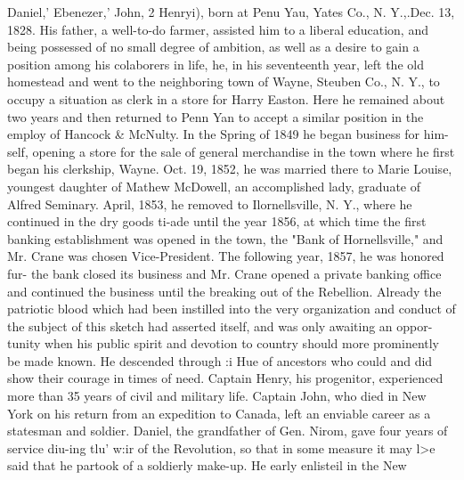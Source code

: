 \documentclass[oneside]{book}
\begin{document}
Daniel,' Ebenezer,' John, 2 Henryi), born at Penu Yau, Yates 
Co., N. Y.,.Dec. 13, 1828. His father, a well-to-do farmer, 
assisted him to a liberal education, and being possessed of no 
small degree of ambition, as well as a desire to gain a position 
among his colaborers in life, he, in his seventeenth year, left the old 
homestead and went to the neighboring town of Wayne, Steuben 
Co., N. Y., to occupy a situation as clerk in a store for Harry 
Easton. Here he remained about two years and then returned to 
Penn Yan to accept a similar position in the employ of Hancock 
\& McNulty. In the Spring of 1849 he began business for him- 
self, opening a store for the sale of general merchandise in the 
town where he first began his clerkship, Wayne. Oct. 19, 1852, 
he was married there to Marie Louise, youngest daughter of 
Mathew McDowell, an accomplished lady, graduate of Alfred 
Seminary. April, 1853, he removed to Ilornellsville, N. Y., 
where he continued in the dry goods ti-ade until the year 1856, at 
which time the first banking establishment was opened in the 
town, the "Bank of Hornellsville," and Mr. Crane was chosen 
Vice-President. The following year, 1857, he was honored fur- 
the bank closed its business and Mr. Crane opened a private 
banking office and continued the business until the breaking out 
of the Rebellion. Already the patriotic blood which had been 
instilled into the very organization and conduct of the subject 
of this sketch had asserted itself, and was only awaiting an oppor- 
tunity when his public spirit and devotion to country should more 
prominently be made known. He descended through :i Hue of 
ancestors who could and did show their courage in times of need. 
Captain Henry, his progenitor, experienced more than 35 years 
of civil and military life. Captain John, who died in New York 
on his return from an expedition to Canada, left an enviable 
career as a statesman and soldier. Daniel, the grandfather of 
Gen. Nirom, gave four years of service diu-ing tlu' w:ir of the 
Revolution, so that in some measure it may l>e said that he 
partook of a soldierly make-up. He early enlisteil in the New 
\end{document}
